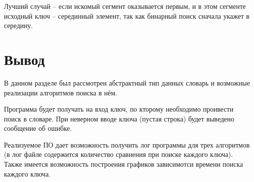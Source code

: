 Лучший случай -- если искомый сегмент оказывается первым, и в этом сегменте исходный ключ -- серединный элемент, так как бинарный поиск сначала укажет в середину. 

\section{Вывод}
В данном разделе был рассмотрен абстрактный тип данных словарь и возможные реализации алгоритмов поиска в нём.

Программа будет получать на вход ключ, по кторому необходимо проивести поиск в словаре. При неверном вводе ключа (пустая строка) будет выведено сообщение об ошибке.

Реализуемое ПО дает возможность получить лог программы для трех алгоритмов (в лог файле содержится количество сравнения при поиске каждого ключа). Также имеется возможность построения графиков зависимотси времени поиска каждого ключа.

